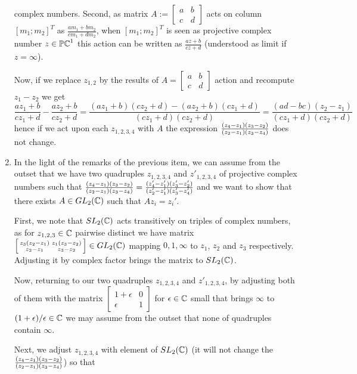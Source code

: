 \documentclass[8pt]{article} %
\begin{document}
\begin{enumerate}
	complex numbers. Second, as matrix $A:=\left[\begin{smallmatrix}a&b\\c&d\end{smallmatrix}\right]$
		acts on column $[m_1;m_2]^T$ as $\frac{am_1+bm_2}{ cm_1+dm_2 }$, when 
		$[m_1;m_2]^T$ is seen as projective complex number $z\in\mathbb{PC}^1$ this action can be written as
		$\frac{ az+b }{ cz+d }$ (understood as limit if $z=\infty$).\par
		Now, if we replace $z_{ 1,2 }$ by the results of $A=
		\left[\begin{smallmatrix}a&b\\c&d\end{smallmatrix}\right]$ action
		and recompute $z_1-z_2$ we get
		\[\frac{ az_1+b }{ cz_1+d }-\frac{ az_2+b }{ cz_2+d }=\frac{ (az_1+b)(cz_2+d)-(az_2+b)(cz_1+d) }{ (cz_1+d)(cz_2+d) }
		=\frac{ (ad-bc)(z_2-z_1) }{ (cz_1+d)(cz_2+d) }\]
		hence if we act upon each $z_{ 1,2,3,4 }$ with $A$ the expression $\frac{(z_4-z_1)(z_3-z_2)}{(z_2-z_1)(z_3-z_4)}$ does not change.
	\item In the light of the remarks of the previous item, we can assume from the outset that we have two quadruples
		$z_{ 1,2,3,4 }$ and $z'_{ 1,2,3,4 }$ of projective complex numbers such that $\frac{(z_4-z_1)(z_3-z_2)}{(z_2-z_1)(z_3-z_4)}=
		\frac{(z'_4-z'_1)(z'_3-z'_2)}{(z'_2-z'_1)(z'_3-z'_4)}$ and we want to show that there exists
		$A\in GL_2(\mathbb{C})$ such that $Az_i=z_i'$.\par
		First, we note that $SL_2(\mathbb{C})$ acts transitively on triples of complex numbers, as for $z_{ 1,2,3 }\in\mathbb{C}$
		pairwise distinct
	we have matrix $\left[\begin{smallmatrix}z_3(z_2-z_1)&z_1(z_3-z_2)\\z_2-z_1&z_3-z_2\end{smallmatrix}\right]\in GL_2(\mathbb{C})$
		mapping $0,1,\infty$ to $z_1$, $z_2$ and $z_3$ respectively. Adjusting it by complex factor brings the matrix to
		$SL_2(\mathbb{C})$.\par
		Now, returning to our two quadruples 
$z_{ 1,2,3,4 }$ and $z'_{ 1,2,3,4 }$, by adjusting both of them with the matrix $\left[\begin{smallmatrix}1+\epsilon&0\\\epsilon&1
\end{smallmatrix}\right]
		$ for $\epsilon\in\mathbb{C}$ small that brings $\infty$ to $(1+\epsilon)/\epsilon\in\mathbb{C}$ we may assume from the
		outset that none of quadruples contain $\infty$.\par
		Next, we adjust $z_{ 1,2,3,4 }$ with element of $SL_2(\mathbb{C})$ (it will not change the $\frac{(z_4-z_1)(z_3-z_2)}{(z_2-z_1)(z_3-z_4)}$) so that

\end{enumerate}
\end{document}
